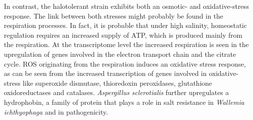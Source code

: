 \documentclass[jof,article,submit,moreauthors,pdftex,10pt,a4paper]{Definitions/mdpi}
\newcommand{\walIch}{\textit{Wallemia ichthyophaga}}
\newcommand{\phiScl}{\textit{Aspergillus sclerotialis}}
\begin{document}
In contrast, the halotolerant strain exhibits both an osmotic- and oxidative-stress response. The link between both stresses  might probably be found in the respiration processes. In fact, it is probable that under high salinity, homeostatic regulation requires an increased supply of ATP, which is produced mainly from the respiration. At the transcriptome level the increased respiration is seen in the upregulation of genes involved in the electron transport chain and the citrate cycle. ROS originating from the respiration induces an oxidative stress response, as can be seen from the increased transcription of genes involved in oxidative-stress like superoxide dismutase, thioredoxin peroxidases, glutathione oxidoreductases and catalases. \phiScl{} further upregulates a hydrophobin, a family of protein that plays a role in salt resistance in \walIch{} and in pathogenicity.









\end{document}

